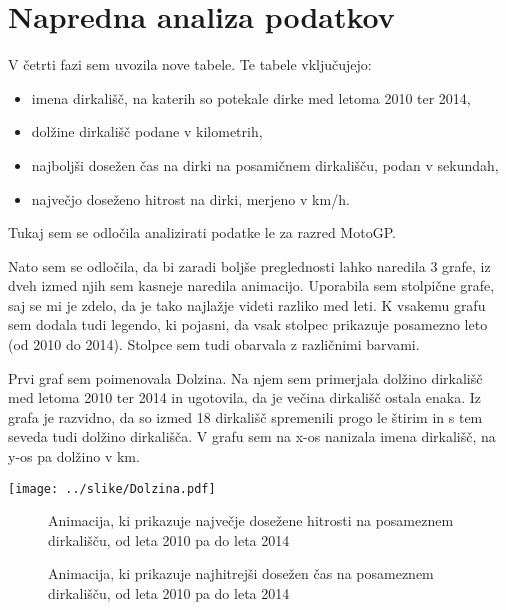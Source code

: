 \documentclass[11pt,a4paper]{article}
\begin{document}


\section{Napredna analiza podatkov}

V četrti fazi sem uvozila nove tabele. Te tabele vključujejo:
\begin{itemize} 
\item imena dirkališč, na katerih so potekale dirke med letoma 2010 ter 2014,
\item dolžine dirkališč podane v kilometrih,
\item najboljši dosežen čas na dirki na posamičnem dirkališču, podan v sekundah,
\item največjo doseženo hitrost na dirki, merjeno v km/h.
\end{itemize}
Tukaj sem se odločila analizirati podatke le za razred MotoGP.

Nato sem se odločila, da bi zaradi boljše preglednosti lahko naredila 3 grafe, iz dveh izmed njih sem kasneje naredila animacijo. Uporabila sem stolpične grafe, saj se mi je zdelo, da je tako najlažje videti razliko med leti. K vsakemu grafu sem dodala tudi legendo, ki pojasni, da vsak stolpec prikazuje posamezno leto (od 2010 do 2014). Stolpce sem tudi obarvala z različnimi barvami.

\newpage
Prvi graf sem poimenovala Dolzina. Na njem sem primerjala dolžino dirkališč med letoma 2010 ter 2014 in ugotovila, da je večina dirkališč ostala enaka. Iz grafa je razvidno, da so izmed 18 dirkališč spremenili progo le štirim in s tem seveda tudi dolžino dirkališča. V grafu sem na x-os nanizala imena dirkališč, na y-os pa dolžino v km.
\begin{center}
\texttt{[image: ../slike/Dolzina.pdf]}
\end{center}


 
\begin{figure}[H] 
\caption{Animacija, ki prikazuje največje dosežene hitrosti na posameznem dirkališču, od leta 2010 pa do leta 2014} 
\end{figure} 

\begin{figure}[H] 
\caption{Animacija, ki prikazuje najhitrejši dosežen čas na posameznem dirkališču, od leta 2010 pa do leta 2014} 
\end{figure} 




 


\end{document}
